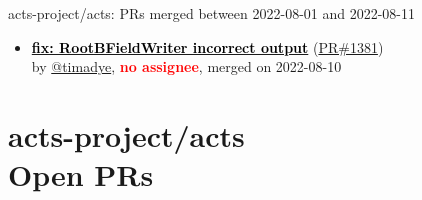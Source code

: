 \begin{frame}[allowframebreaks]{ acts-project/acts: PRs merged 
between 2022-08-01 and 2022-08-11
}
\begin{itemize}
    \item\prmerged
    \hspace*{0.1em}
    \textbf{\href{https://github.com/acts-project/acts/pull/1381}{\textcolor{black}{fix: RootBFieldWriter incorrect output}}}
    (\href{https://github.com/acts-project/acts/pull/1381}{PR\#1381}) \\
    by \href{https://github.com/timadye}{@timadye}, {}\textbf{\textcolor{Red}{no assignee}}, merged on 2022-08-10

  \end{itemize}

\end{frame}



\section{ acts-project/acts \\ Open PRs}

